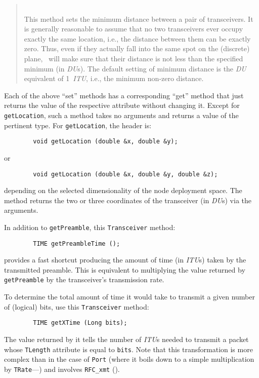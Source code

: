 \begin{quote}
\noindent{} \hspace{0in}\vspace{0.05in}\\
\noindent
This method sets the minimum distance between a pair of transceivers.
It is generally reasonable to assume that no two transceivers ever
occupy exactly the same location, i.e., the distance between them can
be exactly zero.
Thus, even if they actually fall into the same spot on the (discrete)
plane, \smurph\ will make sure that their distance is not less than the
specified minimum (in {\em DU\/}s).
The default setting of minimum distance is the {\em DU\/} equivalent of
1~{\em ITU}, i.e., the minimum non-zero distance.
\end{quote}

Each of the above ``set'' methods has a corresponding ``get'' method that
just returns the value of the respective attribute without changing it.
Except for {\tt getLocation}, such a method takes no arguments and
returns a value of the pertinent type.
For {\tt getLocation}, the header is:
\begin{verbatim}
        void getLocation (double &x, double &y);
\end{verbatim}
\noindent
or
\begin{verbatim}
        void getLocation (double &x, double &y, double &z);
\end{verbatim}
\noindent
depending on the selected dimensionality of the node deployment space.
The method returns the two or three coordinates of the transceiver
(in {\em DU\/}s) via the arguments.

In addition to {\tt getPreamble}, this {\tt Transceiver} method:
\begin{verbatim}
        TIME getPreambleTime ();
\end{verbatim}
provides a fast shortcut producing the amount of time (in {\em ITU\/}s) taken
by the transmitted preamble.
This is equivalent to multiplying the value returned by
{\tt getPreamble} by the transceiver's transmission rate.

To determine the total amount of time it would take to transmit a given number
of (logical) bits, use this {\tt Transceiver} method:
\begin{verbatim}
        TIME getXTime (Long bits);
\end{verbatim}
\noindent
The value returned by it tells the number of {\em ITU\/}s needed to transmit
a packet whose {\tt TLength} attribute is equal to {\tt bits}.
Note that this transformation is more complex than in the case of {\tt Port}
(where it boils down to a simple multiplication by
{\tt TRate}---) and involves {\tt RFC\_xmt}
().

